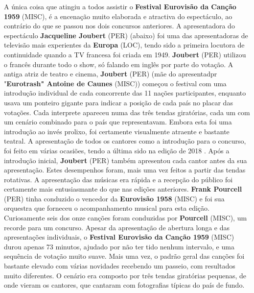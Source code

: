 \documentclass[12pt,a4paper]{article}
\begin{document}
A única coisa que atingiu a todos assistir o \textbf{Festival Eurovisão da Canção 1959} (MISC), é a encenação muito elaborada e atractiva do espectáculo, ao contrário do que se passou nos dois concursos anteriores. A apresentadora do espectáculo \textbf{Jacqueline Joubert} (PER) (abaixo) foi uma das apresentadoras de televisão mais experientes da \textbf{Europa} (LOC), tendo sido a primeira locutora de continuidade quando a TV francesa foi criada em 1949. \textbf{Joubert} (PER) utilizou o francês durante todo o show, só falando em inglês por parte do votação. A antiga atriz de teatro e cinema, \textbf{Joubert} (PER) (mãe do apresentadpr "\textbf{Eurotrash" Antoine de Caunes} (MISC)) começou o festival com uma introdução individual de cada concorrente das 11 nações participantes, enquanto usava um ponteiro gigante para indicar a posição de cada país no placar das votações. Cada interprete apareceu numa das três tendas giratórias, cada um com um cenário combinado para o país que representavam. Embora esta foi uma introdução ao invés prolixo, foi certamente visualmente atraente e bastante teatral. A apresentação de todos os cantores como a introdução para o concurso, foi feito em várias ocasiões, tendo a última sido na edição de 2018 . Após a introdução inicial, \textbf{Joubert} (PER) também apresentou cada cantor antes da sua apresentação. Estes desempenhos foram, mais uma vez feitos a partir das tendas rotativas. A apresentação das músicas era rápida e a recepção do público foi certamente mais entusiasmante do que nas edições anteriores. \textbf{Frank Pourcell} (PER) tinha conduzido o vencedor da \textbf{Eurovisão 1958} (MISC) e foi sua orquestra que forneceu o acompanhamento musical para esta edição. Curiosamente seis dos onze canções foram conduzidas por \textbf{Pourcell} (MISC), um recorde para um concurso. Apesar da apresentação de abertura longa e das apresentações individuais, o \textbf{Festival Eurovisão da Canção 1959} (MISC) durou apenas 73 minutos, ajudado por não ter tido nenhum intervalo, e uma sequência de votação muito suave. Mais uma vez, o padrão geral das canções foi bastante elevado com várias novidades recebendo um passeio, com resultados muito diferentes. O cenário era composto por três tendas giratórias pequenas, de onde vieram os cantores, que cantaram com fotografias típicas do país de fundo.
\end{document}

